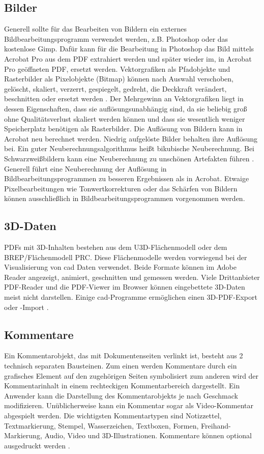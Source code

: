 \subsection{Bilder}
Generell sollte für das Bearbeiten von Bildern ein externes Bildbearbeitungsprogramm verwendet werden, z.B. Photoshop oder das kostenlose Gimp. Dafür kann für die Bearbeitung in Photoshop das Bild mittels Acrobat Pro aus dem PDF extrahiert werden und später wieder im, in Acrobat Pro geöffneten PDF, ersetzt werden. Vektorgrafiken als Pfadobjekte und Rasterbilder als Pixelobjekte (Bitmap) können nach Auswahl verschoben, gelöscht, skaliert, verzerrt, gespiegelt, gedreht, die Deckkraft verändert, beschnitten oder ersetzt werden \cite{schneeberger}. Der Mehrgewinn an Vektorgrafiken liegt in dessen Eigenschaften, dass sie auflösungsunabhängig sind, da sie beliebig groß ohne Qualitätsverlust skaliert werden können und dass sie wesentlich weniger Speicherplatz benötigen als Rasterbilder. Die Auflösung von Bildern kann in Acrobat neu berechnet werden. Niedrig aufgelöste Bilder behalten ihre Auflösung bei. Ein guter Neuberechnungsalgorithmus heißt bikubische Neuberechnung. Bei Schwarzweißbildern kann eine Neuberechnung zu unschönen Artefakten führen \cite{buehler}. Generell führt eine Neuberechnung der Auflösung in Bildbearbeitungsprogrammen zu besseren Ergebnissen als in Acrobat. Etwaige Pixelbearbeitungen wie Tonwertkorrekturen oder das Schärfen von Bildern können ausschließlich in Bildbearbeitungsprogrammen vorgenommen werden. 

\subsection{3D-Daten}
PDFs mit 3D-Inhalten bestehen aus dem U3D-Flächenmodell oder dem BREP/Flächenmodell PRC. Diese Flächenmodelle werden vorwiegend bei der Visualisierung von \gls{cad} Daten verwendet. Beide Formate können im Adobe Reader angezeigt, animiert, geschnitten und gemessen werden. Viele Drittanbieter PDF-Reader und die PDF-Viewer im Browser können eingebettete 3D-Daten meist nicht darstellen. Einige \gls{cad}-Programme ermöglichen einen 3D-PDF-Export oder -Import \cite{wiki-pdf-de}. 

\subsection{Kommentare}
Ein Kommentarobjekt, das mit Dokumentenseiten verlinkt ist, besteht aus 2 technisch separaten Bausteinen. Zum einen werden Kommentare durch ein grafisches Element auf den zugehörigen Seiten symbolisiert zum anderen wird der Kommentarinhalt in einem rechteckigen Kommentarbereich dargestellt. Ein Anwender kann die Darstellung des Kommentarobjekts je nach Geschmack modifizieren. Unüblicherweise kann ein Kommentar sogar als Video-Kommentar abgespielt werden. Die wichtigsten Kommentartypen sind Notizzettel, Textmarkierung, Stempel, Wasserzeichen, Textboxen, Formen, Freihand-Markierung, Audio, Video und 3D-Illustrationen. Kommentare können optional ausgedruckt werden \cite{softx}. 

